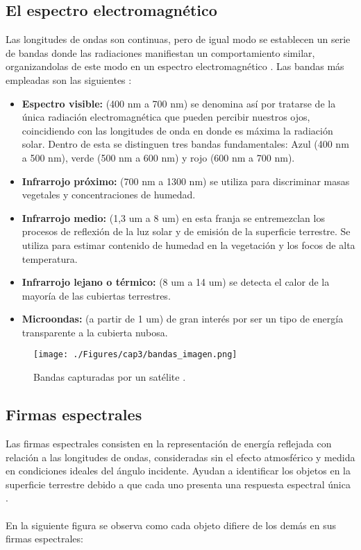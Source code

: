 \subsection{El espectro electromagn\'etico}
Las longitudes de ondas son continuas, pero de igual modo se establecen un serie de bandas donde las radiaciones manifiestan un comportamiento similar, organizandolas de este modo en un espectro electromagn\'etico \cite{remote2010abdulrahman}.
Las bandas m\'as empleadas son las siguientes \cite{salinero2002teledeteccion}:
	\begin{itemize}
		\item \textbf{Espectro visible:} (400 nm a 700 nm) se denomina as\'i por tratarse de la \'unica radiaci\'on electromagn\'etica que pueden percibir nuestros ojos, coincidiendo con las longitudes de onda en donde es m\'axima la radiaci\'on solar. Dentro de esta se distinguen tres bandas fundamentales: Azul (400 nm a 500 nm), verde (500 nm a 600 nm) y rojo (600 nm a 700 nm).
		\item \textbf{Infrarrojo pr\'oximo:} (700 nm a 1300 nm) se utiliza para discriminar masas vegetales y concentraciones de humedad.
		\item \textbf{Infrarrojo medio:} (1,3 um a 8 um) en esta franja se entremezclan los procesos de reflexi\'on de la luz solar y de emisi\'on de la superficie terrestre. Se utiliza para estimar contenido de humedad en la vegetaci\'on y los focos de alta temperatura.
		\item \textbf{Infrarrojo lejano o térmico:} (8 um a 14 um) se detecta el calor de la mayor\'ia de las cubiertas terrestres.
		\item \textbf{Microondas:} (a partir de 1 um) de gran inter\'es por ser un tipo de energ\'ia transparente a la cubierta nubosa.
	\end{itemize}
	\begin{figure}[H]
		\centering
		\texttt{[image: ./Figures/cap3/bandas\_imagen.png]}
		\caption{Bandas capturadas por un sat\'elite \cite{teledet2015perce}.}
		\label{fig:bandasIs}
	\end{figure}

\subsection{Firmas espectrales}
Las firmas espectrales consisten en la representaci\'on de energ\'ia reflejada con relaci\'on a las longitudes de ondas, consideradas sin el efecto atmosf\'erico y medida en condiciones ideales del \'angulo incidente. Ayudan a identificar los objetos en la superficie terrestre debido a que cada uno presenta una respuesta espectral \'unica \cite{sivakumar2004satellite}.\\~\\
En la siguiente figura se observa como cada objeto difiere de los dem\'as en sus firmas espectrales:

